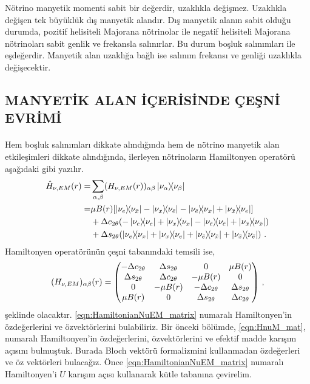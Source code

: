 Nötrino manyetik momenti sabit bir değerdir, uzaklıkla değişmez. Uzaklıkla değişen tek büyüklük dış manyetik alandır. Dış manyetik alanın sabit olduğu durumda, pozitif helisiteli Majorana nötrinolar ile negatif helisiteli Majorana nötrinoları sabit genlik ve frekansla salınırlar. Bu durum boşluk salınımları ile eşdeğerdir. Manyetik alan uzaklığa bağlı ise salınım frekansı ve genliği uzaklıkla değişecektir. 

\subsection{MANYETİK ALAN İÇERİSİNDE ÇEŞNİ EVRİMİ}\label{sec:EMIcerisindeCesniEvri}
\paragraph{}
Hem boşluk salınımları dikkate alındığında hem de nötrino manyetik alan etkileşimleri dikkate alındığında, ilerleyen nötrinoların Hamiltonyen operatörü aşağıdaki gibi yazılır.
\begin{align}
	\nonumber \hat{H}_{\nu,EM}(r) =& \sum_{\alpha,\beta} (H_{\nu,EM}(r))_{\alpha\beta} \dyad{\nu_{\alpha}}{\nu_{\beta}}\\
	 \nonumber=&\mu B(r) \qty[\dyad{\nu_{e}}{\nu_{\bar{x}}}-\dyad{\nu_{x}}{\nu_{\bar{e}}}-\dyad{\nu_{\bar{e}}}{\nu_{x}}+\dyad{\nu_{\bar{x}}}{\nu_{e}}] \\
	 \nonumber &+ \Delta c_{2\theta} \qty(-\dyad{\nu_{e}}{\nu_{e}}+\dyad{\nu_{x}}{\nu_{x}}-\dyad{\nu_{\bar{e}}}{\nu_{\bar{e}}}+\dyad{\nu_{\bar{x}}}{\nu_{\bar{x}}})\\
     &+ \Delta s_{2\theta} \qty(\dyad{\nu_{e}}{\nu_{x}}+\dyad{\nu_{x}}{\nu_{e}}+\dyad{\nu_{\bar{e}}}{\nu_{\bar{x}}}+\dyad{\nu_{\bar{x}}}{\nu_{\bar{e}}})	\text{ .}
\end{align}
Hamiltonyen operatörünün çeşni tabanındaki temsili ise, 
\begin{equation} \label{eqn:HamiltonianNuEM_matrix}
	(H_{\nu,EM})_{\alpha\beta}(r) = \mqty(-\Delta c_{2\theta} & \Delta s_{2\theta} & 0 & \mu B(r)\\\Delta s_{2\theta} & \Delta c_{2\theta} & -\mu B(r) & 0
	\\0 & -\mu B(r) & -\Delta c_{2\theta} & \Delta s_{2\theta}\\ \mu B(r) & 0 & \Delta s_{2\theta} & \Delta c_{2\theta}) \text{ ,}
\end{equation}
şeklinde olacaktır. \eqref{eqn:HamiltonianNuEM_matrix} numaralı Hamiltonyen'in özdeğerlerini ve özvektörlerini bulabiliriz. Bir önceki bölümde, \eqref{eqn:HnuM_mat}, numaralı Hamiltonyen'in özdeğerlerini, özvektörlerini ve efektif madde karışım açısını bulmuştuk. Burada Bloch vektörü formalizmini kullanmadan özdeğerleri ve öz vektörleri bulacağız. Önce \eqref{eqn:HamiltonianNuEM_matrix} numaralı Hamiltonyen'i $ U $ karışım açısı kullanarak kütle tabanına çevirelim.
